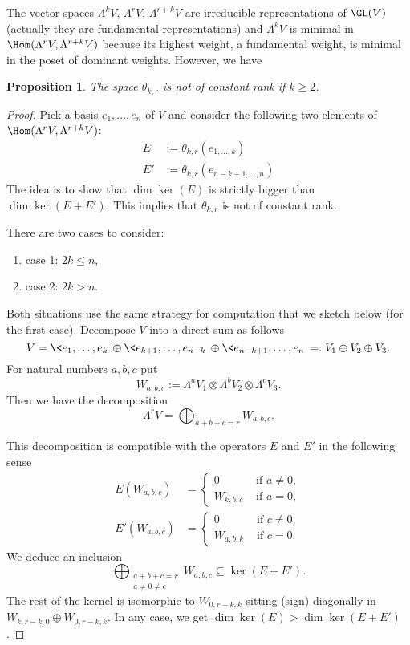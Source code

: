 \documentclass[reqno, 10pt]{amsart}
\theoremstyle{plain}
\newtheorem{proposition}{Proposition}[section]
\theoremstyle{definition}
\newcommand{\eef}{\text{ if }}
\numberwithin{equation}{section}%
\begin{document}
The vector spaces $\Lambda^kV$, $\Lambda^rV$, $\Lambda^{r+k}V$ are irreducible representations of $\GL(V)$ (actually they are fundamental representations) and $\Lambda^kV$ is minimal in $\Hom(\Lambda^rV,\Lambda^{r+k}V)$ because its highest weight, a fundamental weight, is minimal in the poset of dominant weights.
However, we have
\begin{proposition}\label{P:Lambda not ct rank}
	The space $\theta_{k,r}$ is not of constant rank if $k\ge 2$.
\end{proposition}
\begin{proof}
Pick a basis $e_1,\dots,e_n$ of $V$ and consider the following two elements of $\Hom(\Lambda^rV,\Lambda^{r+k}V)$:
\begin{align*}
	E&:=\theta_{k,r}(e_{1,\dots,k})\\
	E'&:=\theta_{k,r}(e_{n-k+1,\dots,n})
\end{align*}
The idea is to show that $\dim\ker(E)$ is strictly bigger than $\dim\ker(E+E')$. This implies that $\theta_{k,r}$ is not of constant rank.

There are two cases to consider: 
\begin{enumerate}
	\item case 1: $2k\le n$,
	\item case 2: $2k>n$.
\end{enumerate}

Both situations use the same strategy for computation that we sketch below (for the first case).
Decompose $V$ into a direct sum as follows
\[ V=\<e_1,\dots,e_k\>\oplus \<e_{k+1},\dots,e_{n-k}\>\oplus\<e_{n-k+1},\dots,e_n\>=:V_1\oplus V_2\oplus V_3.\]
For natural numbers $a,b,c$ put
\[W_{a,b,c}:=\Lambda^aV_1\otimes\Lambda^bV_2\otimes\Lambda^c V_3.\]
Then we have the decomposition
\[ \Lambda^r V = \bigoplus_{a+b+c = r} W_{a,b,c}.\]

This decomposition is compatible with the operators $E$ and $E'$ in the following sense
\begin{align}
	E(W_{a,b,c}) &= \left\{\begin{array}{ll}
		0 & \eef a\neq 0,\\
		W_{k,b,c} & \eef a=0,
	\end{array}\right.\\
	E'(W_{a,b,c})& = \left\{
	\begin{array}{ll}
		0 & \eef c\neq 0,\\
		W_{a,b,k} & \eef c=0.
	\end{array}
	\right.
\end{align}
We deduce an inclusion
\[\bigoplus_{\substack{a+b+c=r\\ a\neq0\neq c}} W_{a,b,c}\subseteq\ker(E+E').\]
The rest of the kernel is isomorphic to $W_{0,r-k,k}$ sitting (sign) diagonally in $W_{k,r-k,0}\oplus W_{0,r-k,k}$.
In any case, we get $\dim\ker(E)>\dim\ker(E+E')$.
\end{proof}
\end{document}
